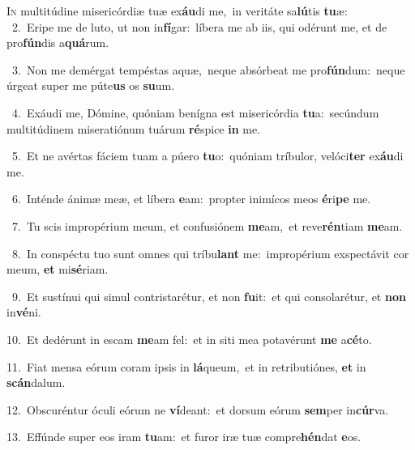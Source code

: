 \lettrine{\initial\textcolor{\initialcolor}{I}}{n} multitúdine misericórdiæ tuæ ex\-\textbf{áu}\-di me,~\star in veritáte sa\-\textbf{lú}\-tis \textbf{tu}\-æ:\\
{\numbfont\textcolor{\numbcolor}{~2.}}~Eripe me de luto, ut non in\-\textbf{fí}\-gar:~\star líbera me ab iis, qui odérunt me, et de pro\-\textbf{fún}\-dis a\-\textbf{quá}\-rum.\par
{\numbfont\textcolor{\numbcolor}{~3.}}~Non me demérgat tempéstas aquæ,~\dagger neque absórbeat me pro\-\textbf{fún}\-dum:~\star neque úrgeat super me púte\textbf{us} os \textbf{su}\-um.\par
{\numbfont\textcolor{\numbcolor}{~4.}}~Exáudi me, Dómine, quóniam benígna est misericórdia \textbf{tu}\-a:~\star secúndum multitúdinem miseratiónum tuárum \textbf{ré}\-spice \textbf{in} me.\par
{\numbfont\textcolor{\numbcolor}{~5.}}~Et ne avértas fáciem tuam a púero \textbf{tu}\-o:~\star quóniam tríbulor, velóci\textbf{ter} ex\-\textbf{áu}\-di me.\par
{\numbfont\textcolor{\numbcolor}{~6.}}~Inténde ánimæ meæ, et líbera \textbf{e}\-am:~\star propter inimícos meos \textbf{é}\-ri\textbf{pe} me.\par
{\numbfont\textcolor{\numbcolor}{~7.}}~Tu scis impropérium meum, et confusiónem \textbf{me}\-am,~\star et reve\-\textbf{rén}\-tiam \textbf{me}\-am.\par
{\numbfont\textcolor{\numbcolor}{~8.}}~In conspéctu tuo sunt omnes qui tríbu\textbf{lant} me:~\star impropérium exspectávit cor meum, \textbf{et} mi\-\textbf{sé}\-riam.\par
{\numbfont\textcolor{\numbcolor}{~9.}}~Et sustínui qui simul contristarétur, et non \textbf{fu}\-it:~\star et qui consolarétur, et \textbf{non} in\-\textbf{vé}\-ni.\par
{\numbfont\textcolor{\numbcolor}{10.}}~Et dedérunt in escam \textbf{me}\-am fel:~\star et in siti mea potavérunt \textbf{me} a\-\textbf{cé}\-to.\par
{\numbfont\textcolor{\numbcolor}{11.}}~Fiat mensa eórum coram ipsis in \textbf{lá}\-queum,~\star et in retributiónes, \textbf{et} in \textbf{scán}\-dalum.\par
{\numbfont\textcolor{\numbcolor}{12.}}~Obscuréntur óculi eórum ne \textbf{ví}\-deant:~\star et dorsum eórum \textbf{sem}\-per in\-\textbf{cúr}\-va.\par
{\numbfont\textcolor{\numbcolor}{13.}}~Effúnde super eos iram \textbf{tu}\-am:~\star et furor iræ tuæ compre\-\textbf{hén}\-dat \textbf{e}\-os.\par
